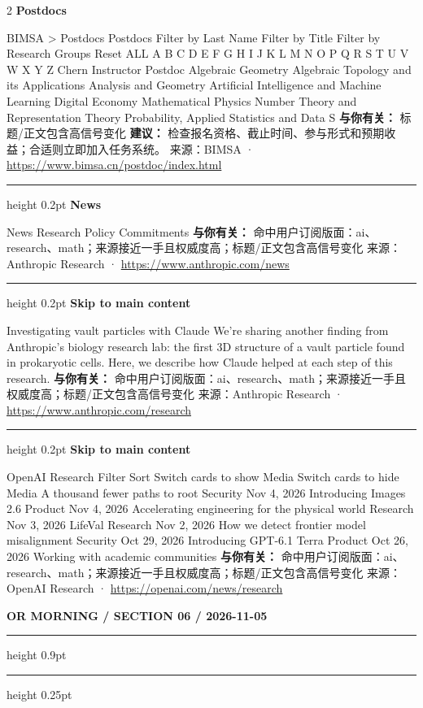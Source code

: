 \documentclass[10.5pt]{ctexart}
\begin{document}
\begin{multicols}{2}
{\large\bfseries Postdocs}\par
BIMSA > Postdocs Postdocs Filter by Last Name Filter by Title Filter by Research Groups Reset ALL A B C D E F G H I J K L M N O P Q R S T U V W X Y Z Chern Instructor Postdoc Algebraic Geometry Algebraic Topology and its Applications Analysis and Geometry Artificial Intelligence and Machine Learning Digital Economy Mathematical Physics Number Theory and Representation Theory Probability, Applied Statistics and Data S
\textbf{与你有关：} 标题/正文包含高信号变化
\textbf{建议：} 检查报名资格、截止时间、参与形式和预期收益；合适则立即加入任务系统。
{\footnotesize\color{ormuted} 来源：BIMSA · \url{https://www.bimsa.cn/postdoc/index.html}}
\vspace{2mm}
\hrule height 0.2pt
\vspace{2mm}
{\large\bfseries News}\par
News Research Policy Commitments
\textbf{与你有关：} 命中用户订阅版面：ai、research、math；来源接近一手且权威度高；标题/正文包含高信号变化
{\footnotesize\color{ormuted} 来源：Anthropic Research · \url{https://www.anthropic.com/news}}
\vspace{2mm}
\hrule height 0.2pt
\vspace{2mm}
{\large\bfseries Skip to main content}\par
Investigating vault particles with Claude We’re sharing another finding from Anthropic’s biology research lab: the first 3D structure of a vault particle found in prokaryotic cells. Here, we describe how Claude helped at each step of this research.
\textbf{与你有关：} 命中用户订阅版面：ai、research、math；来源接近一手且权威度高；标题/正文包含高信号变化
{\footnotesize\color{ormuted} 来源：Anthropic Research · \url{https://www.anthropic.com/research}}
\vspace{2mm}
\hrule height 0.2pt
\vspace{2mm}
{\large\bfseries Skip to main content}\par
OpenAI Research Filter Sort Switch cards to show Media Switch cards to hide Media A thousand fewer paths to root Security Nov 4, 2026 Introducing Images 2.6 Product Nov 4, 2026 Accelerating engineering for the physical world Research Nov 3, 2026 LifeVal Research Nov 2, 2026 How we detect frontier model misalignment Security Oct 29, 2026 Introducing GPT-6.1 Terra Product Oct 26, 2026 Working with academic communities 
\textbf{与你有关：} 命中用户订阅版面：ai、research、math；来源接近一手且权威度高；标题/正文包含高信号变化
{\footnotesize\color{ormuted} 来源：OpenAI Research · \url{https://openai.com/news/research}}
\end{multicols}
\newpage
{\small\bfseries OR MORNING / SECTION 06 / 2026-11-05}
\vspace{2mm}
\hrule height 0.9pt
\vspace{1.5mm}
\hrule height 0.25pt
\vspace{4mm}
\end{document}
